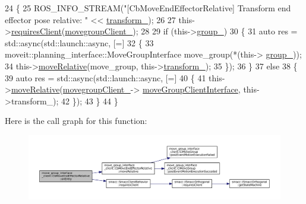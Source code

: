 \begin{DoxyCode}
24 \{
25     ROS\_INFO\_STREAM(\textcolor{stringliteral}{"[CbMoveEndEffectorRelative] Transform end effector pose relative: "} << 
      \hyperlink{classmove__group__interface__client_1_1CbMoveEndEffectorRelative_a180b4e40316bc8d8d578c98b2fac068f}{transform\_});
26 
27     this->\hyperlink{classsmacc_1_1SmaccClientBehavior_a917f001e763a1059af337bf4e164f542}{requiresClient}(\hyperlink{classmove__group__interface__client_1_1CbMoveEndEffectorRelative_a979ec9c309b1b52a0d0e254b49865fdc}{movegroupClient\_});
28 
29     \textcolor{keywordflow}{if} (this->\hyperlink{classmove__group__interface__client_1_1CbMoveEndEffectorRelative_a3165754a85fd7046e470a399f24d9fb6}{group\_})
30     \{
31         \textcolor{keyword}{auto} res = std::async(std::launch::async, [=] 
32         \{
33                 moveit::planning\_interface::MoveGroupInterface move\_group(*(this->
      \hyperlink{classmove__group__interface__client_1_1CbMoveEndEffectorRelative_a3165754a85fd7046e470a399f24d9fb6}{group\_}));
34                 this->\hyperlink{classmove__group__interface__client_1_1CbMoveEndEffectorRelative_a8f64d14c4a398b455b1953ae61cc58bc}{moveRelative}(move\_group, this->\hyperlink{classmove__group__interface__client_1_1CbMoveEndEffectorRelative_a180b4e40316bc8d8d578c98b2fac068f}{transform\_});
35         \});
36     \}
37     \textcolor{keywordflow}{else}
38     \{
39         \textcolor{keyword}{auto} res = std::async(std::launch::async, [=] 
40         \{
41             this->\hyperlink{classmove__group__interface__client_1_1CbMoveEndEffectorRelative_a8f64d14c4a398b455b1953ae61cc58bc}{moveRelative}(\hyperlink{classmove__group__interface__client_1_1CbMoveEndEffectorRelative_a979ec9c309b1b52a0d0e254b49865fdc}{movegroupClient\_}->
      \hyperlink{classmove__group__interface__client_1_1ClMoveGroup_a5f0ea9b52695661b17605691168d1f31}{moveGroupClientInterface}, this->transform\_);
42         \});
43     \}
44 \}
\end{DoxyCode}
Here is the call graph for this function\+:
\nopagebreak
\begin{figure}[H]
\begin{center}
\leavevmode
\includegraphics[width=350pt]{classmove__group__interface__client_1_1CbMoveEndEffectorRelative_a54ba18388e200b43fda82a5f438d677e_cgraph}
\end{center}
\end{figure}
